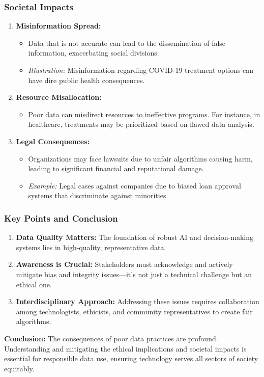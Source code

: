 \documentclass{beamer}
\begin{document}
\begin{frame}[fragile]
    \frametitle{Societal Impacts}
    \begin{enumerate}
        \item \textbf{Misinformation Spread:}
        \begin{itemize}
            \item Data that is not accurate can lead to the dissemination of false information, exacerbating social divisions.
            \item \textit{Illustration:} Misinformation regarding COVID-19 treatment options can have dire public health consequences.
        \end{itemize}

        \item \textbf{Resource Misallocation:}
        \begin{itemize}
            \item Poor data can misdirect resources to ineffective programs. For instance, in healthcare, treatments may be prioritized based on flawed data analysis.
        \end{itemize}

        \item \textbf{Legal Consequences:}
        \begin{itemize}
            \item Organizations may face lawsuits due to unfair algorithms causing harm, leading to significant financial and reputational damage.
            \item \textit{Example:} Legal cases against companies due to biased loan approval systems that discriminate against minorities.
        \end{itemize}
    \end{enumerate}
\end{frame}

\begin{frame}[fragile]
    \frametitle{Key Points and Conclusion}
    \begin{enumerate}
        \item \textbf{Data Quality Matters:} The foundation of robust AI and decision-making systems lies in high-quality, representative data.
        
        \item \textbf{Awareness is Crucial:} Stakeholders must acknowledge and actively mitigate bias and integrity issues—it's not just a technical challenge but an ethical one.
        
        \item \textbf{Interdisciplinary Approach:} Addressing these issues requires collaboration among technologists, ethicists, and community representatives to create fair algorithms.
    \end{enumerate}
    
    \textbf{Conclusion:} The consequences of poor data practices are profound. Understanding and mitigating the ethical implications and societal impacts is essential for responsible data use, ensuring technology serves all sectors of society equitably.
\end{frame}
\end{document}

